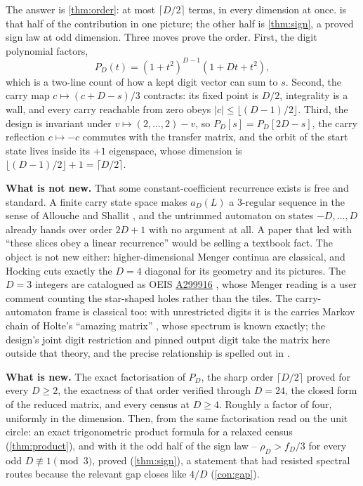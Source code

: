 \documentclass[11pt]{amsart}
\theoremstyle{definition}
\theoremstyle{remark}
\begin{document}
The answer is \cref{thm:order}: at most $\lceil D/2 \rceil$ terms, in every dimension at once.  is that half of the contribution in one picture; the other half is \cref{thm:sign}, a proved sign law at odd dimension. Three moves prove the order. First, the digit polynomial factors,
\[
P_D(t) = (1+t^2)^{D-1}(1+Dt+t^2),
\]
which is a two-line count of how a kept digit vector can sum to $s$. Second, the carry map $c \mapsto (c+D-s)/3$ contracts: its fixed point is $D/2$, integrality is a wall, and every carry reachable from zero obeys $\lvert c \rvert \le \lfloor (D-1)/2 \rfloor$. Third, the design is invariant under $v \mapsto (2,\dots,2)-v$, so $P_D[s] = P_D[2D-s]$, the carry reflection $c \mapsto -c$ commutes with the transfer matrix, and the orbit of the start state lives inside its $+1$ eigenspace, whose dimension is $\lfloor (D-1)/2 \rfloor + 1 = \lceil D/2 \rceil$.

\medskip
\noindent\textbf{What is not new.} That some constant-coefficient recurrence exists is free and standard. A finite carry state space makes $a_D(L)$ a $3$-regular sequence in the sense of Allouche and Shallit \cite{allouche}, and the untrimmed automaton on states $-D,\dots,D$ already hands over order $2D+1$ with no argument at all. A paper that led with ``these slices obey a linear recurrence'' would be selling a textbook fact. The object is not new either: higher-dimensional Menger continua are classical, and Hocking \cite{hocking2023} cuts exactly the $D = 4$ diagonal for its geometry and its pictures. The $D = 3$ integers are catalogued as OEIS \href{https://oeis.org/A299916}{A299916} \cite{oeis}, whose Menger reading is a user comment counting the star-shaped holes rather than the tiles. The carry-automaton frame is classical too: with unrestricted digits it is the carries Markov chain of Holte's ``amazing matrix'' \cite{holte}, whose spectrum is known exactly; the design's joint digit restriction and pinned output digit take the matrix here outside that theory, and the precise relationship is spelled out in \cite{evenhalf}.

\medskip
\noindent\textbf{What is new.} The exact factorisation of $P_D$, the sharp order $\lceil D/2 \rceil$ proved for every $D \ge 2$, the exactness of that order verified through $D = 24$, the closed form of the reduced matrix, and every census at $D \ge 4$. Roughly a factor of four, uniformly in the dimension. Then, from the same factorisation read on the unit circle: an exact trigonometric product formula for a relaxed census (\cref{thm:product}), and with it the odd half of the sign law -- $\rho_D > f_D/3$ for every odd $D \not\equiv 1 \pmod 3$, proved (\cref{thm:sign}), a statement that had resisted spectral routes because the relevant gap closes like $4/D$ (\cref{con:gap}).
\end{document}
